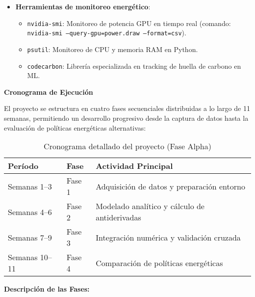 \begin{itemize}
    \item \textbf{Herramientas de monitoreo energético}:
    \begin{itemize}
        \item \texttt{nvidia-smi}: Monitoreo de potencia GPU en tiempo real (comando: \texttt{nvidia-smi --query-gpu=power.draw --format=csv}).
        \item \texttt{psutil}: Monitoreo de CPU y memoria RAM en Python.
        \item \texttt{codecarbon}: Librería especializada en tracking de huella de carbono en ML.
    \end{itemize}
\end{itemize}

\textbf{Cronograma de Ejecución}

El proyecto se estructura en cuatro fases secuenciales distribuidas a lo largo de 11 semanas, permitiendo un desarrollo progresivo desde la captura de datos hasta la evaluación de políticas energéticas alternativas:

\begin{table}[H]
\centering
\caption{Cronograma detallado del proyecto (Fase Alpha)}
\label{tab:cronograma}
\begin{tabular}{@{}lll@{}}
\toprule
\textbf{Período} & \textbf{Fase} & \textbf{Actividad Principal} \\ \midrule
Semanas 1--3 & Fase 1 & Adquisición de datos y preparación entorno \\
Semanas 4--6 & Fase 2 & Modelado analítico y cálculo de antiderivadas \\
Semanas 7--9 & Fase 3 & Integración numérica y validación cruzada \\
Semanas 10--11 & Fase 4 & Comparación de políticas energéticas \\ \bottomrule
\end{tabular}
\end{table}

\textbf{Descripción de las Fases:}


